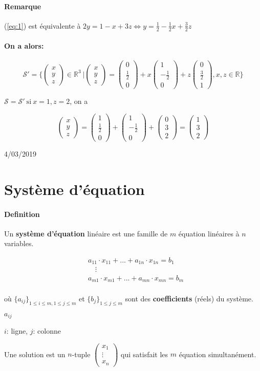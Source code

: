 \documentclass[
    11pt,
    a4paper,
    oneside,
    headinlcude, footinclude,
    twoside,
]{report}
\newcommand{\myVector}[3]{\begin{pmatrix}#1\\#2\\#3\end{pmatrix}}
\newcommand{\ssi}[0]{\Longleftrightarrow}
\newcommand{\markDate}[1]{\begin{flushright}#1\end{flushright}}
\begin{document}
\paragraph{Remarque}
(\ref{eq:1}) est équivalente à $2y = 1 -x + 3z \ssi y = \frac{1}{2} - \frac{1}{2}x
+ \frac{3}{2}z$ 

\paragraph{On a alors:}
$$ \mathcal{S}' = \Bigg\{ \myVector{x}{y}{z} \in \mathbb{R} ^{3} \ \Bigg|
\myVector{x}{y}{z} = \myVector{0}{\frac{1}{2}}{0} + x\myVector{1}{-\frac{1}{2}}{0} +
z\myVector{0}{\frac{3}{2}}{1}, x, z \in \mathbb{R} \Bigg\} $$

$\mathcal{S} = \mathcal{S}'\ \textrm{si}\  x = 1, z = 2$, on a

$$ \myVector{x}{y}{z} = \myVector{1}{\frac{1}{2}}{0} + \myVector{1}{-\frac{1}{2}}{0} +
\myVector{0}{3}{2} = \myVector{1}{3}{2} $$

\markDate{4/03/2019}

\section{Système d'équation}
\label{sub:systeme_d_equation}

\paragraph{Definition}
\label{par:definition}

Un \textbf{système d'équation} linéaire est une famille de $m$ équation
linéaires à $n$ variables.\


\[
    \begin{split}
    &a_{11}\cdot x _{11} + ... + a_{1n} \cdot x_{1n} = b_{1}\\
    & \quad \vdots \\
    &a_{m1}\cdot x _{m1} + ... + a_{mn} \cdot x_{mn} = b_{m}\\
    \end{split}
\]

où $\{a_{ij}\}_{1 \leq i \leq m, 1 \leq j \leq m}$  et $\{b_{j}\}_{1 \leq j
\leq m}$ sont des \textbf{coefficients} (réels) du système.

\begin{center}
    $a_{i j}$

    $i$: ligne, $j$: colonne
\end{center}

Une solution est un $n$-tuple $\myVector{x_{1}}{\vdots}{x_{n}}$ qui satisfait
les $m$ équation simultanément.
\end{document}
